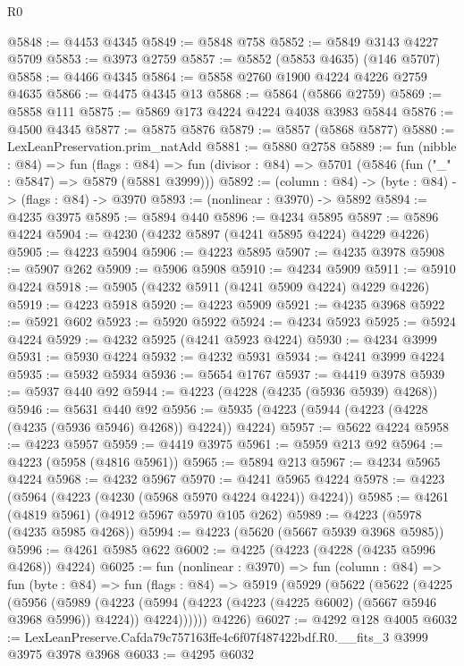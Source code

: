 \begin{lexlean}{R0}
\begin{coremodule}
@5848 := @4453 @4345
@5849 := @5848 @758
@5852 := @5849 @3143 @4227 @5709
@5853 := @3973 @2759
@5857 := @5852 (@5853 @4635) (@146 @5707)
@5858 := @4466 @4345
@5864 := @5858 @2760 @1900 @4224 @4226 @2759 @4635
@5866 := @4475 @4345 @13
@5868 := @5864 (@5866 @2759)
@5869 := @5858 @111
@5875 := @5869 @173 @4224 @4224 @4038 @3983 @5844
@5876 := @4500 @4345
@5877 := @5875 @5876
@5879 := @5857 (@5868 @5877)
@5880 := LexLeanPreservation.prim_natAdd
@5881 := @5880 @2758
@5889 := fun (nibble : @84) =>
  fun (flags : @84) =>
  fun (divisor : @84) => @5701 (@5846 (fun ("_" : @5847) => @5879 (@5881 @3999)))
@5892 := (column : @84) -> (byte : @84) -> (flags : @84) -> @3970
@5893 := (nonlinear : @3970) -> @5892
@5894 := @4235 @3975
@5895 := @5894 @440
@5896 := @4234 @5895
@5897 := @5896 @4224
@5904 := @4230 (@4232 @5897 (@4241 @5895 @4224) @4229 @4226)
@5905 := @4223 @5904
@5906 := @4223 @5895
@5907 := @4235 @3978
@5908 := @5907 @262
@5909 := @5906 @5908
@5910 := @4234 @5909
@5911 := @5910 @4224
@5918 := @5905 (@4232 @5911 (@4241 @5909 @4224) @4229 @4226)
@5919 := @4223 @5918
@5920 := @4223 @5909
@5921 := @4235 @3968
@5922 := @5921 @602
@5923 := @5920 @5922
@5924 := @4234 @5923
@5925 := @5924 @4224
@5929 := @4232 @5925 (@4241 @5923 @4224)
@5930 := @4234 @3999
@5931 := @5930 @4224
@5932 := @4232 @5931
@5934 := @4241 @3999 @4224
@5935 := @5932 @5934
@5936 := @5654 @1767
@5937 := @4419 @3978
@5939 := @5937 @440 @92
@5944 := @4223 (@4228 (@4235 (@5936 @5939) @4268))
@5946 := @5631 @440 @92
@5956 := @5935 (@4223 (@5944 (@4223 (@4228 (@4235 (@5936 @5946) @4268)) @4224)) @4224)
@5957 := @5622 @4224
@5958 := @4223 @5957
@5959 := @4419 @3975
@5961 := @5959 @213 @92
@5964 := @4223 (@5958 (@4816 @5961))
@5965 := @5894 @213
@5967 := @4234 @5965 @4224
@5968 := @4232 @5967
@5970 := @4241 @5965 @4224
@5978 := @4223 (@5964 (@4223 (@4230 (@5968 @5970 @4224 @4224)) @4224))
@5985 := @4261 (@4819 @5961) (@4912 @5967 @5970 @105 @262)
@5989 := @4223 (@5978 (@4235 @5985 @4268))
@5994 := @4223 (@5620 (@5667 @5939 @3968 @5985))
@5996 := @4261 @5985 @622
@6002 := @4225 (@4223 (@4228 (@4235 @5996 @4268)) @4224)
@6025 := fun (nonlinear : @3970) =>
  fun (column : @84) =>
  fun (byte : @84) =>
  fun (flags : @84) =>
  @5919
    (@5929
      (@5622
        (@5622
          (@4225
            (@5956
              (@5989
                (@4223
                  (@5994 (@4223 (@4223 (@4225 @6002) (@5667 @5946 @3968 @5996)) @4224))
                  @4224))))))
      @4226)
@6027 := @4292 @128 @4005
@6032 := LexLeanPreserve.Cafda79c757163ffe4c6f07f487422bdf.R0.__fits_3 @3999 @3975 @3978 @3968
@6033 := @4295 @6032

\end{coremodule}
\end{lexlean}
